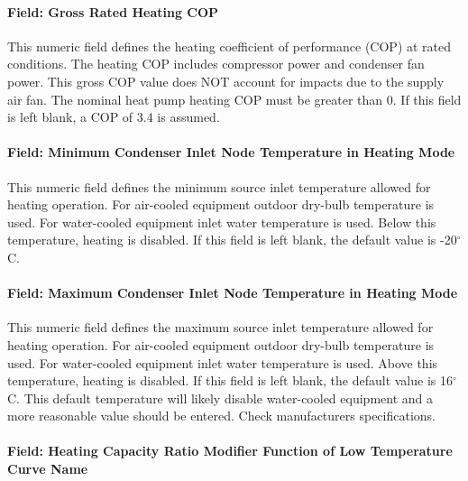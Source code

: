 \paragraph{Field: Gross Rated Heating COP}\label{field-gross-rated-heating-cop-001}

This numeric field defines the heating coefficient of performance (COP) at rated conditions. The heating COP includes compressor power and condenser fan power. This gross COP value does NOT account for impacts due to the supply air fan. The nominal heat pump heating COP must be greater than 0. If this field is left blank, a COP of 3.4 is assumed.

\paragraph{Field: Minimum Condenser Inlet Node Temperature in Heating Mode}\label{field-minimum-condenser-inlet-node-temperature-in-heating-mode-000}

This numeric field defines the minimum source inlet temperature allowed for heating operation. For air-cooled equipment outdoor dry-bulb temperature is used. For water-cooled equipment inlet water temperature is used. Below this temperature, heating is disabled. If this field is left blank, the default value is -20$^\circ$C.

\paragraph{Field: Maximum Condenser Inlet Node Temperature in Heating Mode}\label{field-maximum-condenser-inlet-node-temperature-in-heating-mode-000}

This numeric field defines the maximum source inlet temperature allowed for heating operation. For air-cooled equipment outdoor dry-bulb temperature is used. For water-cooled equipment inlet water temperature is used. Above this temperature, heating is disabled. If this field is left blank, the default value is 16$^\circ$C. This default temperature will likely disable water-cooled equipment and a more reasonable value should be entered.  Check manufacturers specifications.

\paragraph{Field: Heating Capacity Ratio Modifier Function of Low Temperature Curve Name}\label{field-heating-capacity-ratio-modifier-function-of-low-temperature-curve-name}

